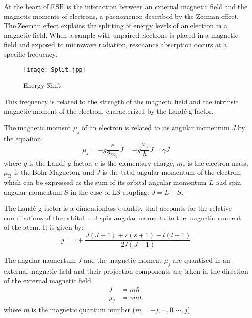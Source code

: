 \documentclass[11pt]{article}
\begin{document}
	At the heart of ESR is the interaction between an external magnetic field and the magnetic moments of electrons, a phenomenon described by the Zeeman effect. The Zeeman effect explains the splitting of energy levels of an electron in a magnetic field. When a sample with unpaired electrons is placed in a magnetic field and exposed to microwave radiation, resonance absorption occurs at a specific frequency.
	
	\begin{figure}[htbp]
		\centering
		\caption{Energy Shift}
		\texttt{[image: Split.jpg]}
	\end{figure}
	
	This frequency is related to the strength of the magnetic field and the intrinsic magnetic moment of the electron, characterized by the Landé g-factor.
	
	The magnetic moment $\mu_j$ of an electron is related to its angular momentum $J$ by the equation:
	\begin{equation}
		\mu_j = -g \frac{e}{2m_e} J = -g \frac{\mu_\mathrm{B}}{\hbar} J = \gamma J \label{eq:1}
	\end{equation}
	where $g$ is the Landé g-factor, $e$ is the elementary charge, $m_e$ is the electron mass, $\mu_\mathrm{B}$ is the Bohr Magneton, and $J$ is the total angular momentum of the electron, which can be expressed as the sum of its orbital angular momentum $L$ and spin angular momentum $S$ in the case of LS coupling: $J = L + S$.
	
	The Landé g-factor is a dimensionless quantity that accounts for the relative contributions of the orbital and spin angular momenta to the magnetic moment of the atom. It is given by:
	\begin{equation}
		g = 1 + \frac{J(J + 1) + s(s + 1) - l(l + 1)}{2J(J + 1)} \label{eq:2}
	\end{equation}
	
	The angular momentum $J$ and the magnetic moment $\mu_j$ are quantized in an external magnetic field and their projection components are taken in the direction of the external magnetic field.
	\begin{equation}
		\begin{split}
			J &= m\hbar \\
			\mu_j &= \gamma m \hbar
		\end{split} \label{eq:3}
	\end{equation}
	where $m$ is the magnetic quantum number ($m = -j, \cdots, 0, \cdots, j$)
	
\end{document}

